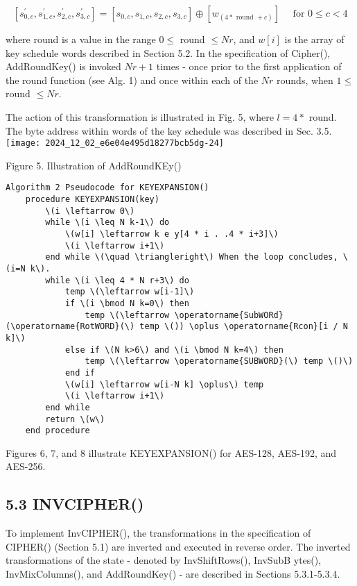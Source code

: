 \[
\left[s_{0, c}^{\prime}, s_{1, c}^{\prime}, s_{2, c}^{\prime}, s_{3, c}^{\prime}\right]=\left[s_{0, c}, s_{1, c}, s_{2, c}, s_{3, c}\right] \oplus\left[w_{(4 * \text { round }+c)}\right] \quad \text { for } 0 \leq c<4
\]

where round is a value in the range \(0 \leq\) round \(\leq N r\), and \(w[i]\) is the array of key schedule words described in Section 5.2. In the specification of Cipher(), AddRoundKey() is invoked \(N r+1\) times - once prior to the first application of the round function (see Alg. 1) and once within each of the \(N r\) rounds, when \(1 \leq\) round \(\leq N r\).

The action of this transformation is illustrated in Fig. 5, where \(l=4 *\) round. The byte address within words of the key schedule was described in Sec. 3.5.\\
\texttt{[image: 2024\_12\_02\_e6e04e495d18277bcb5dg-24]}

Figure 5. Illustration of AddRoundKEy()

\begin{verbatim}
Algorithm 2 Pseudocode for KEYEXPANSION()
    procedure KEYEXPANSION(key)
        \(i \leftarrow 0\)
        while \(i \leq N k-1\) do
            \(w[i] \leftarrow k e y[4 * i . .4 * i+3]\)
            \(i \leftarrow i+1\)
        end while \(\quad \triangleright\) When the loop concludes, \(i=N k\).
        while \(i \leq 4 * N r+3\) do
            temp \(\leftarrow w[i-1]\)
            if \(i \bmod N k=0\) then
                temp \(\leftarrow \operatorname{SubWORd}(\operatorname{RotWORD}(\) temp \()) \oplus \operatorname{Rcon}[i / N k]\)
            else if \(N k>6\) and \(i \bmod N k=4\) then
                temp \(\leftarrow \operatorname{SUBWORD}(\) temp \()\)
            end if
            \(w[i] \leftarrow w[i-N k] \oplus\) temp
            \(i \leftarrow i+1\)
        end while
        return \(w\)
    end procedure
\end{verbatim}

Figures 6, 7, and 8 illustrate KEYEXPANSION() for AES-128, AES-192, and AES-256.

\subsection*{5.3 INVCIPHER()}
To implement InvCIPHER(), the transformations in the specification of CIPHER() (Section 5.1) are inverted and executed in reverse order. The inverted transformations of the state - denoted by InvShiftRows(), InvSubB ytes(), InvMixColumns(), and AddRoundKey() - are described in Sections 5.3.1-5.3.4.

